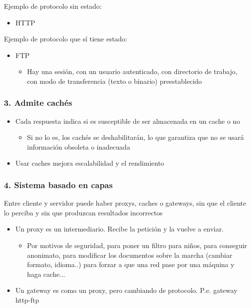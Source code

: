 \documentclass[ucs]{beamer}
\begin{document}
\begin{frame}[fragile]
\frametitle{}
Ejemplo de protocolo sin estado:
\begin{itemize}
\item
HTTP
\end{itemize}

Ejemplo de protocolo que sí tiene estado:

\begin{itemize}
\item
FTP

\begin{itemize}
\item
Hay una sesión, con un usuario autenticado, con directorio de trabajo,
con modo de transferencia (texto o binario) preestablecido
\end{itemize}
\end{itemize}

\end{frame}


\begin{frame}[fragile]
\frametitle{3. Admite cachés}
\begin{itemize}
\item
Cada respuesta indica si es susceptible de ser almacenada en un cache o no

\begin{itemize}
\item
Si no lo es, los cachés se deshabilitarán,
lo que garantiza que no se usará información
obsoleta o inadecuada
\end{itemize}
\item
Usar caches mejora escalabilidad y el rendimiento
\end{itemize}
\end{frame}



\begin{frame}[fragile]
\frametitle{4. Sistema basado en capas}
Entre cliente y servidor puede haber proxys, caches o gateways,
sin que el cliente lo perciba y sin que produzcan resultados incorrectos
\begin{itemize}
\item

Un proxy es un intermediario. Recibe la petición y la vuelve a enviar.

\begin{itemize}
\item
Por motivos de seguridad, para poner un filtro para niños, para conseguir anonimato,
para modificar los documentos sobre la marcha (cambiar formato, idioma..)
para forzar a que una red pase por una máquina y haga cache...
\end{itemize}

\item
Un gateway es como un proxy, pero cambiando de protocolo. P.e. gateway http-ftp
\end{itemize}

\end{frame}
\end{document}
